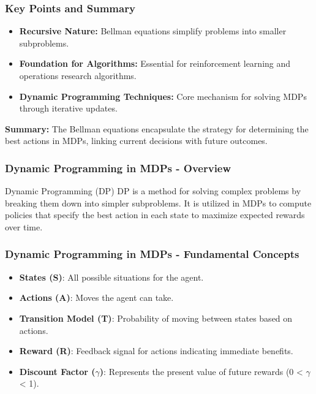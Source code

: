 \documentclass[aspectratio=169]{beamer}
\begin{document}
\begin{frame}[fragile]
    \frametitle{Key Points and Summary}
    \begin{itemize}
        \item \textbf{Recursive Nature:} Bellman equations simplify problems into smaller subproblems.
        \item \textbf{Foundation for Algorithms:} Essential for reinforcement learning and operations research algorithms.
        \item \textbf{Dynamic Programming Techniques:} Core mechanism for solving MDPs through iterative updates.
    \end{itemize}
    
    \textbf{Summary:} The Bellman equations encapsulate the strategy for determining the best actions in MDPs, linking current decisions with future outcomes.
\end{frame}

\begin{frame}[fragile]
    \frametitle{Dynamic Programming in MDPs - Overview}
    \begin{block}{Dynamic Programming (DP)}
        DP is a method for solving complex problems by breaking them down into simpler subproblems. 
        It is utilized in MDPs to compute policies that specify the best action in each state to maximize expected rewards over time.
    \end{block}
\end{frame}

\begin{frame}[fragile]
    \frametitle{Dynamic Programming in MDPs - Fundamental Concepts}
    \begin{itemize}
        \item \textbf{States (S)}: All possible situations for the agent.
        \item \textbf{Actions (A)}: Moves the agent can take.
        \item \textbf{Transition Model (T)}: Probability of moving between states based on actions.
        \item \textbf{Reward (R)}: Feedback signal for actions indicating immediate benefits.
        \item \textbf{Discount Factor ($\gamma$)}: Represents the present value of future rewards (0 < $\gamma$ < 1).
    \end{itemize}
\end{frame}
\end{document}
